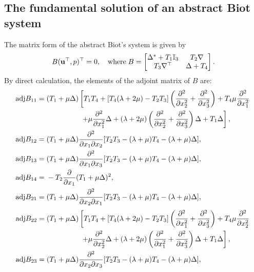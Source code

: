 \documentclass[11pt]{article}
\newcommand{\mat}{\mathbb}
\newcommand{\pa}{\partial}
\newcommand{\la}{\lambda}
\begin{document}
\begin{appendices}
\section{The fundamental solution of an abstract Biot system}
\label{app:aBiot_fs}
The matrix form of the abstract Biot's system is given by
\begin{equation*}
B(\mathbf{u}^{\top},p)^{\top}=0,\quad{\rm where}\;B=\begin{bmatrix}
\Delta^*+T_1\mat{I}_3 & T_2\nabla \\
T_3\nabla^{\top} & \Delta +T_4\\
\end{bmatrix}.
\end{equation*}
By direct calculation, the elements of the adjoint matrix of $B$ are:
\begin{equation*}
\begin{aligned} 
{\rm adj}B_{11}= &\;(T_1+\mu\Delta)\left[T_1T_4+[T_4(\la+2\mu)-T_2T_3]\left(\frac{\pa ^2}
{\pa x_2^2}+\frac{\pa ^2}{\pa x_3^2}\right)+T_4\mu\frac{\pa ^2}{\pa x_1^2}\right.\\
&\left.\qquad\qquad\quad+\mu \frac{\pa ^2}{\pa x_1^2}\Delta +(\la+2\mu)\left(\frac{\pa ^2}
{\pa x_2^2}+\frac{\pa ^2}{\pa x_3^2}\right)\Delta+T_1\Delta\right],\\
{\rm adj}B_{12}=&\;(T_1+\mu\Delta) \frac{\pa ^2}{\pa x_1\pa x_2}[T_2T_3-(\la +\mu)T_4-(\la +\mu)\Delta],\\
{\rm adj}B_{13}=&\;(T_1+\mu\Delta) \frac{\pa ^2}{\pa x_1\pa x_3}[T_2T_3-(\la +\mu)T_4-(\la +\mu)\Delta],\\
{\rm adj}B_{14}=&\;-T_2 \frac{\pa }{\pa x_1}(T_1+\mu\Delta)^2,\\
{\rm adj}B_{21}=&\;(T_1+\mu\Delta) \frac{\pa ^2}{\pa x_2\pa x_1}[T_2T_3-(\la +\mu)T_4-(\la +\mu)\Delta],\\
\end{aligned}
\end{equation*}
\begin{equation*}
\begin{aligned}
{\rm adj}B_{22}= &\;(T_1+\mu\Delta)\left[T_1T_4+[T_4(\la+2\mu)-T_2T_3]\left(\frac{\pa ^2}
{\pa x_1^2}+\frac{\pa ^2}{\pa x_3^2}\right)+T_4\mu\frac{\pa ^2}{\pa x_2^2}\right.\\
&\left.\qquad\qquad\quad+\mu \frac{\pa ^2}{\pa x_2^2}\Delta +(\la+2\mu)\left(\frac{\pa ^2}
{\pa x_1^2}+\frac{\pa ^2}{\pa x_3^2}\right)\Delta+T_1\Delta\right],\\
{\rm adj}B_{23}=&\;(T_1+\mu\Delta) \frac{\pa ^2}{\pa x_2\pa x_3}[T_2T_3-(\la +\mu)T_4-(\la +\mu)\Delta],\\

\end{aligned}
\end{equation*}
\end{appendices}
\end{document}
